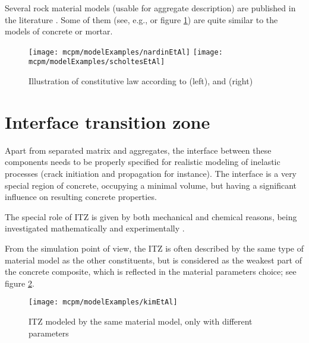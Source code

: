Several rock material models (usable for aggregate description) are published in the literature
\cite{
	ErgenzingerSeifriedEberhard2012a,%
	HuangLecampionDetournay2013a,%
	ChoMartinSego2007a,%
	NardinSchrefler2004a,%
	PotyondyCundall2004a,%
	RojekOnateCarlosKargl2011a,%
	ScholtesDonze2013a,%
	ScholtesDonze2012a,%
	TangXuaKoucLindqvistcLiu2001a,%
	WangTonon2009a%
}.
Some of them (see, e.g.,
\cite {
	NardinSchrefler2004a,%
	ScholtesDonze2013a,%
	ScholtesDonze2012a%
} or figure \ref{figMCPMRockModels}) are quite similar to the models of concrete or mortar.
\begin{figure}[ht]
	\centering
	\texttt{[image: mcpm/modelExamples/nardinEtAl]}
	\texttt{[image: mcpm/modelExamples/scholtesEtAl]}
	\caption[Illustration of constitutive law]{Illustration of constitutive law according to
		\cite{NardinSchrefler2004a} (left),
		and
		\cite{ScholtesDonze2013a} (right)
	}
	\label{figMCPMRockModels}
\end{figure}

\section{Interface transition zone}
Apart from separated matrix and aggregates, the interface between these components needs to be properly specified for realistic modeling of inelastic processes (crack initiation and propagation for instance).
The interface is a very special region of concrete, occupying a minimal volume, but having a significant influence on resulting concrete properties.

The special role of ITZ is given by both mechanical and chemical reasons, being investigated mathematically and experimentally
\cite{%
	ErdemDawsonThom2012a,%
	GiaccioZerbino1998a,%
	GiaccioZerbinoPonceBatic2008a,%
	RaoPrasad2002a%
}.

From the simulation point of view, the ITZ is often described by the same type of material model as the other constituents, but is considered as the weakest part of the concrete composite, which is reflected in the material parameters choice; see figure \ref{figMCPMItzModeledSameAsMortar}.
\begin{figure}[ht]
	\centering
	\texttt{[image: mcpm/modelExamples/kimEtAl]}
	\caption[ITZ modeled by the same material model]{ITZ modeled by the same material model, only with different parameters
		\cite{KimAlrub2011a}
	}
	\label{figMCPMItzModeledSameAsMortar}
\end{figure}














